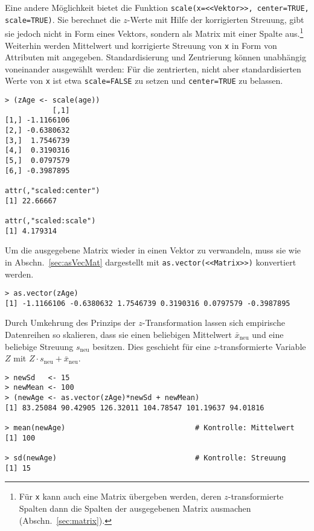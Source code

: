 Eine andere Möglichkeit bietet die Funktion \lstinline!scale(x=<<Vektor>>, center=TRUE, scale=TRUE)!. Sie berechnet die $z$-Werte mit Hilfe der korrigierten Streuung, gibt sie jedoch nicht in Form eines Vektors, sondern als Matrix mit einer Spalte aus.\footnote{Für \lstinline!x! kann auch eine Matrix übergeben werden, deren $z$-transformierte Spalten dann die Spalten der ausgegebenen Matrix ausmachen (Abschn.\ \ref{sec:matrix}).} Weiterhin werden Mittelwert und korrigierte Streuung von \lstinline!x! in Form von Attributen mit angegeben. Standardisierung und Zentrierung können unabhängig voneinander ausgewählt werden: Für die zentrierten, nicht aber standardisierten Werte von \lstinline!x! ist etwa \lstinline!scale=FALSE! zu setzen und \lstinline!center=TRUE! zu belassen.
\begin{lstlisting}
> (zAge <- scale(age))
           [,1]
[1,] -1.1166106
[2,] -0.6380632
[3,]  1.7546739
[4,]  0.3190316
[5,]  0.0797579
[6,] -0.3987895

attr(,"scaled:center")
[1] 22.66667

attr(,"scaled:scale")
[1] 4.179314
\end{lstlisting}

Um die ausgegebene Matrix wieder in einen Vektor zu verwandeln, muss sie wie in Abschn.\ \ref{sec:asVecMat} dargestellt mit \lstinline!as.vector(<<Matrix>>)! konvertiert werden.
\begin{lstlisting}
> as.vector(zAge)
[1] -1.1166106 -0.6380632 1.7546739 0.3190316 0.0797579 -0.3987895
\end{lstlisting}

Durch Umkehrung des Prinzips der $z$-Transformation lassen sich empirische Datenreihen so skalieren, dass sie einen beliebigen Mittelwert $\bar{x}_{\text{neu}}$ und eine beliebige Streuung $s_{\text{neu}}$ besitzen. Dies geschieht für eine $z$-transformierte Variable $Z$ mit $Z \cdot s_{\text{neu}} + \bar{x}_{\text{neu}}$.
\begin{lstlisting}
> newSd   <- 15
> newMean <- 100
> (newAge <- as.vector(zAge)*newSd + newMean)
[1] 83.25084 90.42905 126.32011 104.78547 101.19637 94.01816

> mean(newAge)                              # Kontrolle: Mittelwert
[1] 100

> sd(newAge)                                # Kontrolle: Streuung
[1] 15
\end{lstlisting}

